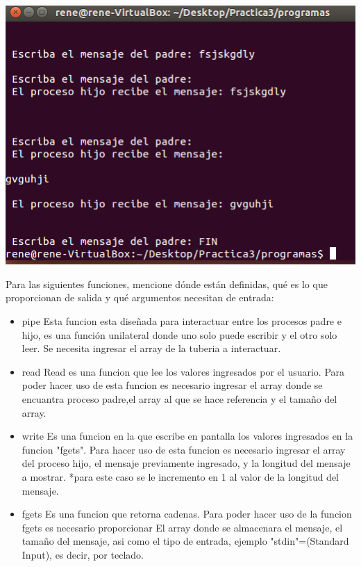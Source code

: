 \begin{center}
		\includegraphics[scale=0.15]{imagenes/Captura4.png}
	\end{center}

	Para las siguientes funciones, mencione dónde están definidas, qué es lo que proporcionan de salida y qué argumentos necesitan de entrada:

	\begin{itemize}
		\item pipe 
		Esta funcion esta diseñada para interactuar entre los procesos padre e hijo, es una función unilateral donde uno solo puede escribir y el otro solo leer.
		Se necesita ingresar el array de la tuberia a interactuar.
		\item read
		 Read es una funcion que lee los valores ingresados por el usuario.
		Para poder  hacer uso de esta funcion es necesario ingresar el array donde se encuantra proceso padre,el array al que se hace referencia y el tamaño del array.
		\item write 
		Es una funcion en la que escribe en pantalla los valores ingresados en la funcion "fgets".
		Para hacer uso de esta funcion es necesario ingresar el array del proceso hijo, el mensaje previamente ingresado, y la longitud del mensaje a mostrar.
		*para este caso se le incremento en 1 al valor de la longitud del mensaje.
		\item fgets
		 Es una funcion que retorna  cadenas.
		Para poder hacer uso de la funcion fgets es necesario proporcionar El array donde se almacenara el mensaje, el tamaño del mensaje, asi como el tipo de entrada, ejemplo "stdin"=(Standard Input), es decir, por teclado.

	\end{itemize}
